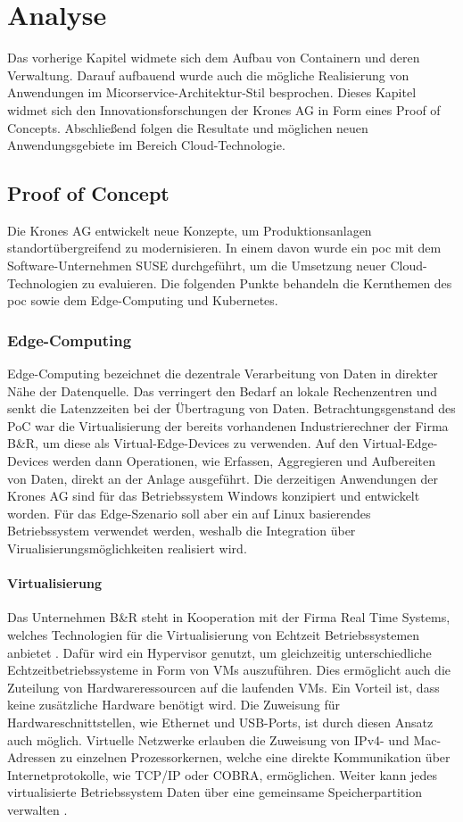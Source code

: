 \chapter{Analyse}\label{Analyse}

Das vorherige Kapitel widmete sich dem Aufbau von Containern und deren Verwaltung.
Darauf aufbauend wurde auch die mögliche Realisierung von Anwendungen im Micorservice-Architektur-Stil besprochen. 
Dieses Kapitel widmet sich den Innovationsforschungen der Krones AG in Form eines Proof of Concepts.
Abschließend folgen die Resultate und möglichen neuen Anwendungsgebiete im Bereich Cloud-Technologie.


\section{Proof of Concept}\label{moderninfra}
Die Krones AG entwickelt neue Konzepte, um Produktionsanlagen standortübergreifend zu modernisieren. 
In einem davon wurde ein \ac{poc} mit dem Software-Unternehmen SUSE durchgeführt, um die Umsetzung neuer Cloud-Technologien zu evaluieren. 
Die folgenden Punkte behandeln die Kernthemen des \acs{poc} sowie dem Edge-Computing und Kubernetes.

\subsection{Edge-Computing}
Edge-Computing bezeichnet die dezentrale Verarbeitung von Daten in direkter Nähe der Datenquelle. 
Das verringert den Bedarf an lokale Rechenzentren und senkt die Latenzzeiten bei der Übertragung von Daten. 
Betrachtungsgenstand des PoC war die Virtualisierung der bereits vorhandenen Industrierechner der Firma B\&R, um diese als Virtual-Edge-Devices zu verwenden.
Auf den Virtual-Edge-Devices werden dann Operationen, wie Erfassen, Aggregieren und Aufbereiten von Daten, direkt an der Anlage ausgeführt. 
Die derzeitigen Anwendungen der Krones AG sind für das Betriebssystem Windows konzipiert und entwickelt worden.
Für das Edge-Szenario soll aber ein auf Linux basierendes Betriebssystem verwendet werden,
weshalb die Integration über Virualisierungsmöglichkeiten realisiert wird.

\subsubsection{Virtualisierung}
Das Unternehmen B\&R steht in Kooperation mit der Firma Real Time Systems, welches Technologien für die Virtualisierung von Echtzeit Betriebssystemen anbietet \cite{rtosandbundr}.
Dafür wird ein Hypervisor genutzt, um gleichzeitig unterschiedliche Echtzeitbetriebssysteme in Form von VMs auszuführen.
Dies ermöglicht auch die Zuteilung von Hardwareressourcen auf die laufenden VMs.
Ein Vorteil ist, dass keine zusätzliche Hardware benötigt wird.
Die Zuweisung für Hardwareschnittstellen, wie Ethernet und USB-Ports, ist durch diesen Ansatz auch möglich.
Virtuelle Netzwerke erlauben die Zuweisung von IPv4- und Mac-Adressen zu einzelnen Prozessorkernen, welche
eine direkte Kommunikation über Internetprotokolle, wie TCP/IP oder COBRA, ermöglichen.
Weiter kann jedes virtualisierte Betriebssystem Daten über eine gemeinsame Speicherpartition verwalten \cite{rtos}.

